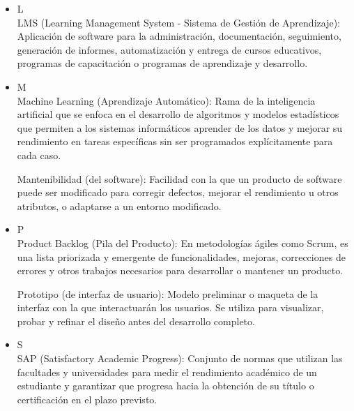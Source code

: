 \begin{itemize}
    \item L \\
    LMS (Learning Management System - Sistema de Gestión de Aprendizaje): Aplicación de software para la administración, documentación, seguimiento, generación de informes, automatización y entrega de cursos educativos, programas de capacitación o programas de aprendizaje y desarrollo.

    \item M \\
    Machine Learning (Aprendizaje Automático): Rama de la inteligencia artificial que se enfoca en el desarrollo de algoritmos y modelos estadísticos que permiten a los sistemas informáticos aprender de los datos y mejorar su rendimiento en tareas específicas sin ser programados explícitamente para cada caso.
    \par
    Mantenibilidad (del software): Facilidad con la que un producto de software puede ser modificado para corregir defectos, mejorar el rendimiento u otros atributos, o adaptarse a un entorno modificado.

    \item P \\
    Product Backlog (Pila del Producto): En metodologías ágiles como Scrum, es una lista priorizada y emergente de funcionalidades, mejoras, correcciones de errores y otros trabajos necesarios para desarrollar o mantener un producto.
    \par
    Prototipo (de interfaz de usuario): Modelo preliminar o maqueta de la interfaz con la que interactuarán los usuarios.
    Se utiliza para visualizar, probar y refinar el diseño antes del desarrollo completo.

    \item S \\
    SAP (Satisfactory Academic Progress): Conjunto de normas que utilizan las facultades y universidades para medir el rendimiento académico de un estudiante y garantizar que progresa hacia la obtención de su título o certificación en el plazo previsto.


\end{itemize}
